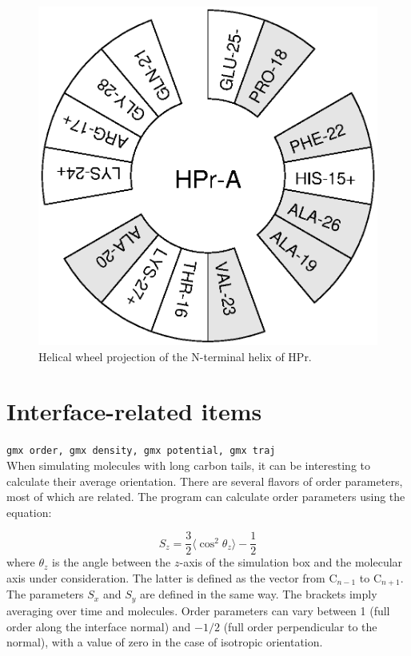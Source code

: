 \begin{figure}
\centerline{\includegraphics[width=\htw]{plots/hpr-wheel}}
\caption{Helical wheel projection of the N-terminal helix of HPr.}
\label{fig:wheel}
\end{figure}


\section{Interface-related items}
{\tt gmx order, gmx density, gmx potential, gmx traj}\\
When simulating molecules with long carbon tails, it can be
interesting to calculate their average orientation. There are several
flavors of order parameters, most of which are related. The program
{\tt {}} can calculate order parameters using the equation:

\begin{equation}
S_{z} = \frac{3}{2}\langle {\cos^2{\theta_z}} \rangle - \frac{1}{2}
\label{eqn:Sgr}
\end{equation}
where $\theta_z$ is the angle between the $z$-axis of the simulation
box and the molecular axis under consideration. The latter is defined as the
vector from C$_{n-1}$ to C$_{n+1}$. The parameters $S_x$
and $S_y$ are defined in the same way. The brackets imply averaging over time
and molecules. Order parameters can vary between 1 (full order along
the interface normal) and $-1/2$ (full order perpendicular to the
normal), with a value of zero in the case of isotropic orientation.


